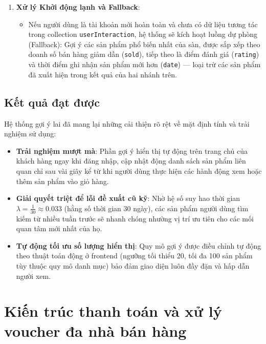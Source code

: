 \documentclass[../DoAn.tex]{subfiles}
\begin{document}
\begin{enumerate}
\begin{itemize}
            \item Loại bỏ các sản phẩm đã được người dùng tương tác hoặc có trạng thái \texttt{isActive} là \texttt{false}.
        \end{itemize}
    \item \textbf{Xử lý Khởi động lạnh và Fallback}:
        \begin{itemize}
            \item Nếu người dùng là tài khoản mới hoàn toàn và chưa có dữ liệu tương tác trong collection \texttt{userInteraction}, hệ thống sẽ kích hoạt luồng dự phòng (Fallback): Gợi ý các sản phẩm phổ biến nhất của sàn, được sắp xếp theo doanh số bán hàng giảm dần (\texttt{sold}), tiếp theo là điểm đánh giá (\texttt{rating}) và thời điểm ghi nhận sản phẩm mới hơn (\texttt{date}) — loại trừ các sản phẩm đã xuất hiện trong kết quả của hai nhánh trên.
        \end{itemize}
\end{enumerate}

\subsection{Kết quả đạt được}
Hệ thống gợi ý lai đã mang lại những cải thiện rõ rệt về mặt định tính và trải nghiệm sử dụng:
\begin{itemize}
    \item \textbf{Trải nghiệm mượt mà}: Phần gợi ý hiển thị tự động trên trang chủ của khách hàng ngay khi đăng nhập, cập nhật động danh sách sản phẩm liên quan chỉ sau vài giây kể từ khi người dùng thực hiện các hành động xem hoặc thêm sản phẩm vào giỏ hàng.
    \item \textbf{Giải quyết triệt để lỗi đề xuất cũ kỹ}: Nhờ hệ số suy hao thời gian $\lambda = \frac{1}{30} \approx 0.033$ (hằng số thời gian 30 ngày), các sản phẩm người dùng tìm kiếm từ nhiều tuần trước sẽ nhanh chóng nhường vị trí ưu tiên cho các mối quan tâm mới nhất của họ.
    \item \textbf{Tự động tối ưu số lượng hiển thị}: Quy mô gợi ý được điều chỉnh tự động theo thuật toán động ở frontend (ngưỡng tối thiểu 20, tối đa 100 sản phẩm tùy thuộc quy mô danh mục) bảo đảm giao diện luôn đầy đặn và hấp dẫn người xem.
\end{itemize}

\section{Kiến trúc thanh toán và xử lý voucher đa nhà bán hàng}
\label{section:5.3}
\end{document}
